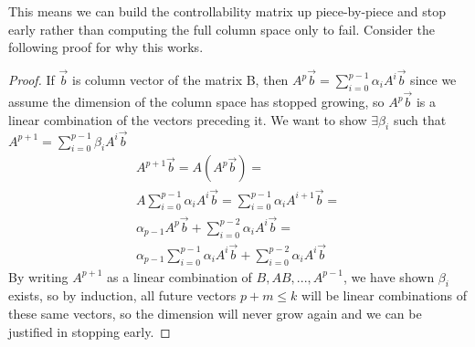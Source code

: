 \documentclass{article}
\newtheorem{proof}{Proof}
\begin{document}
This means we can build the controllability matrix up piece-by-piece and stop early rather than computing the full column space only to fail. Consider the following proof for why this works.
\begin{proof}
    If $\vec{b}$ is column vector of the matrix B, then $A^p \vec{b}=\sum_{i=0}^{p-1}{\alpha_iA^i\vec{b}}$ since we assume the dimension of the column space has stopped growing,
    so $A^p\vec{b}$ is a linear combination of the vectors preceding it.
    We want to show $\exists \beta_i$ such that $A^{p+1}=\sum_{i=0}^{p-1}{\beta_iA^i\vec{b}}$
    \[
        \begin{array}{c}
            A^{p+1}\vec{b}=A(A^p\vec{b}) =\\
            A\sum_{i=0}^{p-1}{\alpha_iA^i\vec{b}} = \sum_{i=0}^{p-1}{\alpha_iA^{i+1}\vec{b}}=\\
            \alpha_{p-1}A^p\vec{b}+ \sum_{i=0}^{p-2}{\alpha_iA^{i}\vec{b}}=\\
            \alpha_{p-1}\sum_{i=0}^{p-1}{\alpha_iA^i\vec{b}}+\sum_{i=0}^{p-2}{\alpha_iA^{i}\vec{b}}
        \end{array}
        \]
    By writing $A^{p+1}$ as a linear combination of $B, AB,...,A^{p-1}$, we have shown $\beta_i$ exists, so by induction, all future vectors $p+m\leq k$ will be linear combinations of these same vectors, 
    so the dimension will never grow again and we can be justified in stopping early.
\end{proof}
\end{document}
